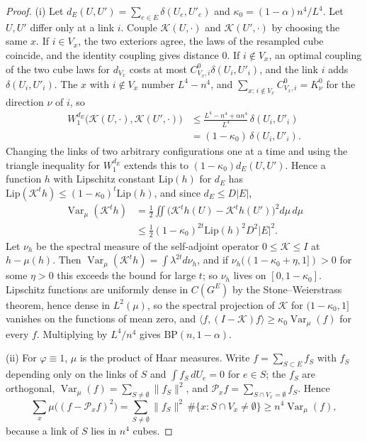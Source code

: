 \documentclass[aps,prd,twocolumn,superscriptaddress,nofootinbib,longbibliography,floatfix,amsmath,amssymb,10pt]{revtex4-2}
\theoremstyle{definition}
\theoremstyle{remark}
\newcommand{\Var}{\operatorname{Var}}
\newcommand{\ip}[2]{\langle #1,#2\rangle}
\begin{document}
\begin{proof}
(i) Let $d_E(U,U')=\sum_{e\in E}\delta(U_e,U'_e)$ and $\kappa_0=(1-\alpha)
n^4/L^4$. Let $U,U'$ differ only at a link $i$. Couple $\mathcal K(U,\cdot)$
and $\mathcal K(U',\cdot)$ by choosing the same $x$. If $i\in V_x$, the two
exteriors agree, the laws of the resampled cube coincide, and the identity
coupling gives distance $0$. If $i\notin V_x$, an optimal coupling of the two
cube laws for $d_{V_x}$ costs at most $C^0_{V_x,i}\delta(U_i,U'_i)$, and the
link $i$ adds $\delta(U_i,U'_i)$. The $x$ with $i\notin V_x$ number $L^4-n^4$,
and $\sum_{x:\,i\notin V_x}C^0_{V_x,i}=K^0_\nu$ for the direction $\nu$ of
$i$, so
\[
\begin{split}
W_1^{d_E}\bigl(\mathcal K(U,\cdot),\mathcal K(U',\cdot)\bigr)&\le\frac{L^4-
n^4+\alpha n^4}{L^4}\,\delta(U_i,U'_i)\\
&=(1-\kappa_0)\,\delta(U_i,U'_i).
\end{split}
\]
Changing the links of two arbitrary configurations one at a time and using
the triangle inequality for $W_1^{d_E}$ extends this to $(1-\kappa_0)d_E(U,
U')$. Hence a function $h$ with Lipschitz constant $\mathrm{Lip}(h)$ for
$d_E$ has $\mathrm{Lip}(\mathcal K^th)\le(1-\kappa_0)^t\mathrm{Lip}(h)$, and
since $d_E\le D\lvert E\rvert$,
\[
\begin{split}
\Var_\mu(\mathcal K^th)&=\tfrac12\iint\bigl(\mathcal K^th(U)-\mathcal
K^th(U')\bigr)^2d\mu\,d\mu\\
&\le\tfrac12(1-\kappa_0)^{2t}\mathrm{Lip}(h)^2D^2\lvert E\rvert^2 .
\end{split}
\]
Let $\nu_h$ be the spectral measure of the self-adjoint operator
$0\le\mathcal K\le I$ at $h-\mu(h)$. Then $\Var_\mu(\mathcal K^th)=\int
\lambda^{2t}d\nu_h$, and if $\nu_h((1-\kappa_0+\eta,1])>0$ for some $\eta>0$
this exceeds the bound for large $t$; so $\nu_h$ lives on $[0,1-\kappa_0]$.
Lipschitz functions are uniformly dense in $C(G^E)$ by the Stone--Weierstrass
theorem, hence dense in $L^2(\mu)$, so the spectral projection of $\mathcal K$
for $(1-\kappa_0,1]$ vanishes on the functions of mean zero, and
$\ip f{(I-\mathcal K)f}\ge\kappa_0\Var_\mu(f)$ for every $f$. Multiplying by
$L^4/n^4$ gives $\mathrm{BP}(n,1-\alpha)$.

(ii) For $\varphi\equiv1$, $\mu$ is the product of Haar measures. Write
$f=\sum_{S\subset E}f_S$ with $f_S$ depending only on the links of $S$ and
$\int f_S\,dU_e=0$ for $e\in S$; the $f_S$ are orthogonal, $\Var_\mu(f)=
\sum_{S\ne\emptyset}\lVert f_S\rVert^2$, and $\mathcal P_xf=\sum_{S\cap V_x=
\emptyset}f_S$. Hence
\[
\sum_x\mu\bigl((f-\mathcal P_xf)^2\bigr)=\sum_{S\ne\emptyset}\lVert f_S
\rVert^2\,\#\{x:S\cap V_x\ne\emptyset\}\ge n^4\Var_\mu(f),
\]
because a link of $S$ lies in $n^4$ cubes.
\end{proof}
\end{document}
